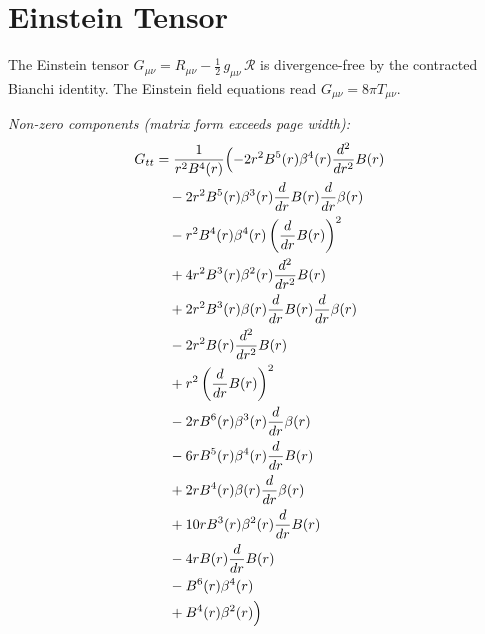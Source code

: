 \documentclass[11pt,a4paper]{article}
\begin{document}
\section{Einstein Tensor}
The Einstein tensor $G_{\mu\nu} = R_{\mu\nu} - \frac{1}{2}\,g_{\mu\nu}\,\mathcal{R}$ is divergence-free by the contracted Bianchi identity. The Einstein field equations read $G_{\mu\nu} = 8\pi T_{\mu\nu}$.
\par\noindent\textit{Non-zero components (matrix form exceeds page width):}
\begin{align*}
  G_{tt} &= \frac{1}{r^{2} B^{4}{\left(r \right)}}\Bigl(- 2 r^{2} B^{5}{\left(r \right)} \beta^{4}{\left(r \right)} \frac{d^{2}}{d r^{2}} B{\left(r \right)} \\
  &\quad - 2 r^{2} B^{5}{\left(r \right)} \beta^{3}{\left(r \right)} \frac{d}{d r} B{\left(r \right)} \frac{d}{d r} \beta{\left(r \right)} \\
  &\quad - r^{2} B^{4}{\left(r \right)} \beta^{4}{\left(r \right)} \left(\frac{d}{d r} B{\left(r \right)}\right)^{2} \\
  &\quad + 4 r^{2} B^{3}{\left(r \right)} \beta^{2}{\left(r \right)} \frac{d^{2}}{d r^{2}} B{\left(r \right)} \\
  &\quad + 2 r^{2} B^{3}{\left(r \right)} \beta{\left(r \right)} \frac{d}{d r} B{\left(r \right)} \frac{d}{d r} \beta{\left(r \right)} \\
  &\quad - 2 r^{2} B{\left(r \right)} \frac{d^{2}}{d r^{2}} B{\left(r \right)} \\
  &\quad + r^{2} \left(\frac{d}{d r} B{\left(r \right)}\right)^{2} \\
  &\quad - 2 r B^{6}{\left(r \right)} \beta^{3}{\left(r \right)} \frac{d}{d r} \beta{\left(r \right)} \\
  &\quad - 6 r B^{5}{\left(r \right)} \beta^{4}{\left(r \right)} \frac{d}{d r} B{\left(r \right)} \\
  &\quad + 2 r B^{4}{\left(r \right)} \beta{\left(r \right)} \frac{d}{d r} \beta{\left(r \right)} \\
  &\quad + 10 r B^{3}{\left(r \right)} \beta^{2}{\left(r \right)} \frac{d}{d r} B{\left(r \right)} \\
  &\quad - 4 r B{\left(r \right)} \frac{d}{d r} B{\left(r \right)} \\
  &\quad - B^{6}{\left(r \right)} \beta^{4}{\left(r \right)} \\
  &\quad + B^{4}{\left(r \right)} \beta^{2}{\left(r \right)}\Bigr)
\end{align*}
\end{document}
